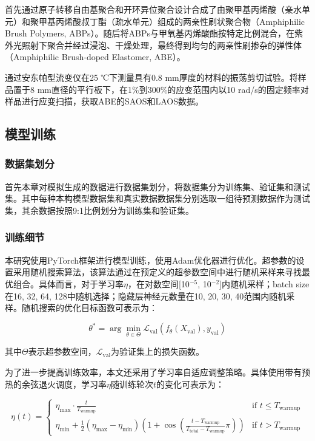 首先通过原子转移自由基聚合和开环异位聚合设计合成了由聚甲基丙烯酸（亲水单元）和聚甲基丙烯酸叔丁酯（疏水单元）组成的两亲性刷状聚合物（Amphiphilic Brush Polymers, ABPs）。随后将ABPs与甲氧基丙烯酸酯按特定比例混合，在紫外光照射下聚合并经过浸泡、干燥处理，最终得到均匀的两亲性刷掺杂的弹性体（Amphiphilic Brush-doped Elastomer, ABE）。

通过安东帕型流变仪在25 ℃下测量具有0.8 mm厚度的材料的振荡剪切试验。将样品置于8 mm直径的平行板下，在1\%到300\%的应变范围内以10 rad/s的固定频率对样品进行应变扫描，获取ABE的SAOS和LAOS数据。
\subsection{模型训练}
\subsubsection{数据集划分}
首先本章对模拟生成的数据进行数据集划分，将数据集分为训练集、验证集和测试集。其中每种本构模型数据集和真实数据数据集分别选取一组待预测数据作为测试集，其余数据按照9:1比例划分为训练集和验证集。

\subsubsection{训练细节} \label{sec:training method}
本研究使用PyTorch框架进行模型训练，使用Adam优化器进行优化。超参数的设置采用随机搜索算法，该算法通过在预定义的超参数空间中进行随机采样来寻找最优组合。具体而言，对于学习率$\eta$，在对数空间[10$^{-5}$, 10$^{-2}$]内随机采样；batch size在{16, 32, 64, 128}中随机选择；隐藏层神经元数量在{10, 20, 30, 40}范围内随机采样。随机搜索的优化目标函数可表示为：

\begin{equation}
  \theta^* = \arg \min_{\theta \in \Theta} \mathcal{L}_{\text{val}}(f_\theta(X_{\text{val}}), y_{\text{val}})
\end{equation}

其中$\Theta$表示超参数空间，$\mathcal{L}_{\text{val}}$为验证集上的损失函数。

为了进一步提高训练效率，本文还采用了学习率自适应调整策略。具体使用带有预热的余弦退火调度，学习率$\eta$随训练轮次$t$的变化可表示为：

\begin{equation}
  \eta(t) = \begin{cases}
    \eta_{\text{max}} \cdot \frac{t}{T_{\text{warmup}}}                                                                                             & \text{if } t \leq T_{\text{warmup}} \\
    \eta_{\text{min}} + \frac{1}{2}(\eta_{\text{max}}-\eta_{\text{min}})(1+\cos(\frac{t-T_{\text{warmup}}}{T_{\text{total}}-T_{\text{warmup}}}\pi)) & \text{if } t > T_{\text{warmup}}
  \end{cases}
\end{equation}

